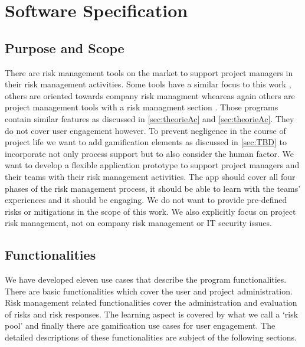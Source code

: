 \newpage
\section{Software Specification}
\label{sec:domainB}

\subsection{Purpose and Scope}
\label{sec:domainBa}
There are risk management tools on the market to support project managers in their risk management activities. Some tools have a similar focus to this work \cite{OperationalRiskManagement}, \cite{RiskManagementSoftware} others are oriented towards company risk managment \cite{QHSERiskCompliance} wheareas again others are project management tools with a risk managment section \cite{https://www.ntaskmanager.com/}. Those programs contain similar features as discussed in \ref{sec:theorieAc} and \ref{sec:theorieAc}. They do not cover user engagement however. To prevent negligence in the course of project life we want to add gamification elements as discussed in \ref{sec:TBD} to incorporate not only process support but to also consider the human factor.
We want to develop a flexible application prototype to support project managers and their teams with their risk management activities. The app should cover all four phases of the risk management process, it should be able to learn with the teams’ experiences and it should be engaging.
We do not want to provide pre-defined risks or mitigations in the scope of this work. We also explicitly focus on project risk management, not on company risk management or IT security issues. 

\subsection{Functionalities}
\label{sec:domainBb}
We have developed eleven use cases that describe the program functionalities. There are basic functionalities which cover the user and project administration. Risk management related functionalities cover the administration and evaluation of risks and risk responses. The learning aspect is covered by what we call a ‘risk pool’ and finally there are gamification use cases for user engagement. The detailed descriptions of these functionalities are subject of the following sections. 

